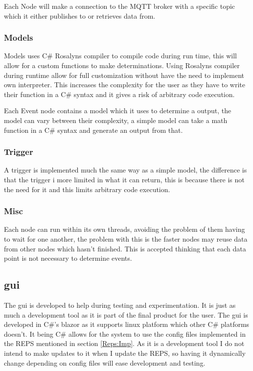 \documentclass[conference]{IEEEtran}
\begin{document}
			Each Node will make a connection to the MQTT broker with a specific topic which it either publishes to or retrieves data from.
			
			
			\subsubsection{Models}
				Models uses C\# Rosalyns compiler to compile code during run time, this will allow for a custom functions to make determinations. Using Rosalyns compiler during runtime allow for full customization without have the need to implement own interpreter. This increases the complexity for the user as they have to write their function in a C\# syntax and it gives a risk of arbitrary code execution.
				
				
				Each Event node contains a model which it uses to determine a output, the model can vary between their complexity, a simple model can take a math function in a C\# syntax and generate an output from that.
				
			\subsubsection{Trigger}
				A trigger is implemented much the same way as a simple model, the difference is that the trigger i more limited in what it can return, this is because there is not the need for it and this limits arbitrary code execution.
			
			\subsubsection{Misc}
				Each node can run within its own threads, avoiding the problem of them having to wait for one another, the problem with this is the faster nodes may reuse data from other nodes which hasn't finished. This is accepted thinking that each data point is not necessary to determine events.
	
		\subsection{\gls{gui}}
			The \gls{gui} is developed to help during testing and experimentation. It is just as much a development tool as it is part of the final product for the user. The \gls{gui} is developed in C\#'s blazor as it supports linux platform which other C\# platforms doesn't. It being C\# allows for the system to use the config files implemented in the REPS mentioned in section \ref{Reps:Imp}. As it is a development tool I do not intend to make updates to it when I update the REPS, so having it dynamically change depending on config files will ease development and testing.
			
\end{document}
